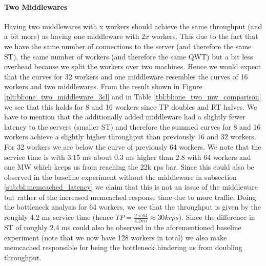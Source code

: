 \documentclass[11pt,a4paper]{article}
\begin{document}
\paragraph{Two Middlewares} Having two middlewares with x workers should achieve the same throughput (and a bit more) as having one middleware with $2x$ workers. This due to the fact that we have the same number of connections to the server (and therefore the same ST), the same number of workers (and therefore the same QWT) but a bit less overhead because we split the workers over two machines. Hence we would expect that the curves for 32 workers and one middleware resembles the curves of 16 workers and two middlewares. From the result shown in Figure \ref{plt:bl:one_two_middleware_3cl} and in Table \ref{tbl:bl:one_two_mw_comparison} we see that this holds for 8 and 16 workers since TP doubles and RT halves. We have to mention that the additionally added middleware had a slightly fewer latency to the servers (smaller ST) and therefore the summed curves for 8 and 16 workers achieve a slightly higher throughput than previously 16 and 32 workers. For 32 workers we are below the curve of previously 64 workers. We note that the service time is with 3.15 ms about 0.3 ms higher than 2.8 with 64 workers and one MW which keeps us from reaching the 22k rps bar. Since this could also be observed in the baseline experiment without the middleware in subsection \ref{sub:bl:memcached_latency} we claim that this is not an issue of the middleware but rather of the increased memcached response time due to more traffic. Doing the bottleneck analysis for 64 workers, we see that the throughput is given by the roughly 4.2 ms service time (hence $TP = \frac{2\times64}{4.2ms} \approx 30k rps$). Since the difference in ST of roughly 2.4 ms could also be observed in the aforementioned baseline experiment (note that we now have 128 workers in total) we also make memcached responsible for being the bottleneck hindering us from doubling throughput.
\end{document}
